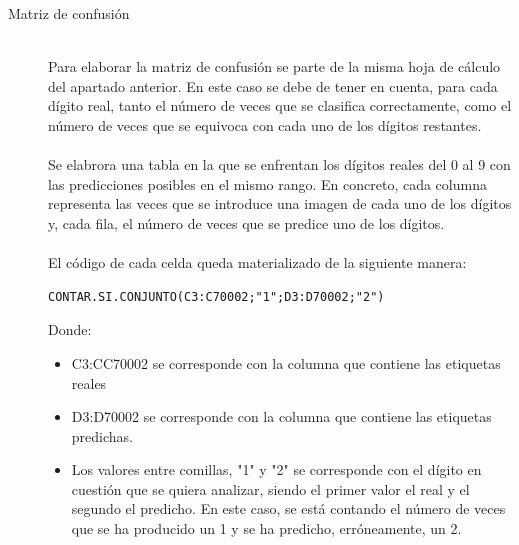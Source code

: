 \begin{description}
\begin{itemize}
{	}
	\end{itemize}
	\vspace{5pt}
	\item[Matriz de confusión] \hfill 
	\vspace{5pt}
	\\
	Para elaborar la matriz de confusión se parte de la misma hoja de cálculo del apartado anterior. En este caso se debe de tener en cuenta, para cada dígito real, tanto el número de veces que se clasifica correctamente, como el número de veces que se equivoca con cada uno de los dígitos restantes.\\
	\vspace{-10pt}
	\\
	Se elabrora una tabla en la que se enfrentan los dígitos reales del 0 al 9 con las predicciones posibles en el mismo rango. En concreto, cada columna representa las veces que se introduce una imagen de cada uno de los dígitos y, cada fila, el número de veces que se predice uno de los dígitos.\\
	\vspace{-10pt}
	\\
	El código de cada celda queda materializado de la siguiente manera:
	\vspace{10pt}
	\begin{lstlisting}[frame=single]
		CONTAR.SI.CONJUNTO(C3:C70002;"1";D3:D70002;"2")
	\end{lstlisting}
	Donde:
	\begin{itemize}
		\item C3:CC70002 se corresponde con la columna que contiene las etiquetas reales
		\item D3:D70002 se corresponde con la columna que contiene las etiquetas predichas.
		\item Los valores entre comillas, "1" y "2" se corresponde con el dígito en cuestión que se quiera analizar, siendo el primer valor el real y el segundo el predicho. En este caso, se está contando el número de veces que se ha producido un 1 y se ha predicho, erróneamente, un 2.
	\end{itemize}
	

\end{description}
